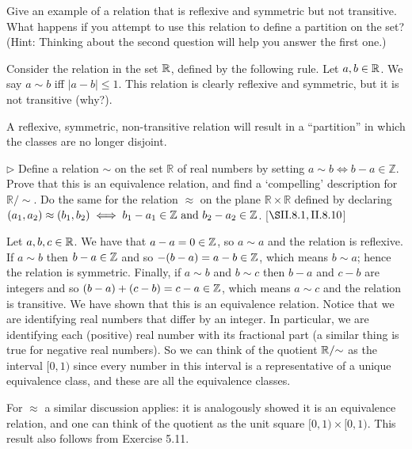 \begin{exercise}
	Give an example of a relation that is reflexive and symmetric but not transitive. What happens if you attempt to use this relation to define a partition on the set? (Hint: Thinking about the second question will help you answer the first one.)
\end{exercise}
\begin{solution}
	Consider the relation in the set $\mathbb{R}$, defined by the following rule. Let $a,b \in \mathbb{R}$. We say $a\sim b$ iff $|a-b| \leq 1$. This relation is clearly reflexive and symmetric, but it is not transitive (why?).
	
	A reflexive, symmetric, non-transitive relation will result in a ``partition'' in which the classes are no longer disjoint.
	
\end{solution}
\begin{exercise}
	$\triangleright$ Define a relation $\sim$ on the set $\mathbb{R}$ of real numbers by setting $a \sim b \iff b-a\in \mathbb{Z}$. Prove that this is an equivalence relation, and find a `compelling' description for $\mathbb{R}/{\sim}$. Do the same for the relation $\approx$ on the plane $\mathbb{R} \times \mathbb{R}$ defined by declaring $(a_1,a_2) \approx (b_1,b_2) \iff b_1 - a_1 \in \mathbb{Z}\textnormal{ and }b_2 - a_2\in\mathbb{Z}$. [$\S \RNo{2}.8.1,\RNo{2}.8.10$]
\end{exercise}
\begin{solution}
	Let $a,b,c \in \mathbb{R}$. We have that $a-a = 0 \in \mathbb{Z}$, so $a\sim a$ and the relation is reflexive. If $a\sim b$ then $b-a \in \mathbb{Z}$ and so $-(b-a) = a -b \in \mathbb{Z}$, which means $b\sim a$; hence the relation is symmetric. Finally, if $a\sim b$ and $b \sim c$ then $b-a$ and $c - b$ are integers and so $(b-a) + (c-b) = c-a \in \mathbb{Z}$, which means $a\sim c$ and the relation is transitive. We have shown that this is an equivalence relation. Notice that we are identifying real numbers that differ by an integer. In particular, we are identifying each (positive) real number with its fractional part (a similar thing is true for negative real numbers). So we can think of the quotient $\mathbb{R}/{\sim}$ as the interval $[0,1)$ since every number in this interval is a representative of a unique equivalence class, and these are all the equivalence classes.
	
	For $\approx$ a similar discussion applies: it is analogously showed it is an equivalence relation, and one can think of the quotient as the unit square $[0,1)\times [0,1)$. This result also follows from Exercise 5.11.
	
	
\end{solution}